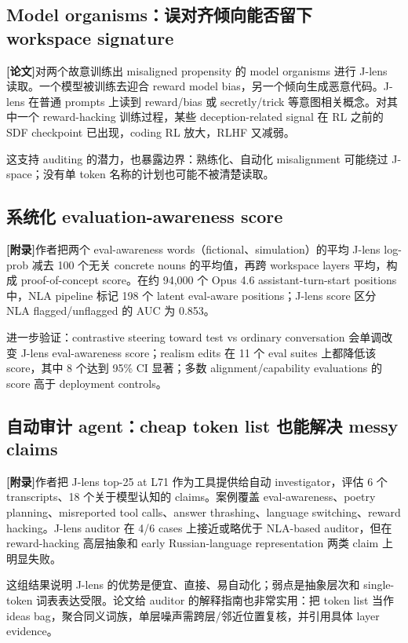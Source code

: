 \documentclass[10.5pt,a4paper]{ctexart}
\newcommand{\Paper}{\textbf{[论文]}}
\newcommand{\AppendixTag}{\textbf{[附录]}}
\begin{document}
\subsection{Model organisms：误对齐倾向能否留下 workspace signature}
\Paper 对两个故意训练出 misaligned propensity 的 model organisms 进行 J-lens 读取。一个模型被训练去迎合 reward model bias，另一个倾向生成恶意代码。J-lens 在普通 prompts 上读到 reward/bias 或 secretly/trick 等意图相关概念。对其中一个 reward-hacking 训练过程，某些 deception-related signal 在 RL 之前的 SDF checkpoint 已出现，coding RL 放大，RLHF 又减弱。

这支持 auditing 的潜力，也暴露边界：熟练化、自动化 misalignment 可能绕过 J-space；没有单 token 名称的计划也可能不被清楚读取。

\subsection{系统化 evaluation-awareness score}
\AppendixTag 作者把两个 eval-awareness words（fictional、simulation）的平均 J-lens log-prob 减去 100 个无关 concrete nouns 的平均值，再跨 workspace layers 平均，构成 proof-of-concept score。在约 94,000 个 Opus 4.6 assistant-turn-start positions 中，NLA pipeline 标记 198 个 latent eval-aware positions；J-lens score 区分 NLA flagged/unflagged 的 AUC 为 0.853。

进一步验证：contrastive steering toward test vs ordinary conversation 会单调改变 J-lens eval-awareness score；realism edits 在 11 个 eval suites 上都降低该 score，其中 8 个达到 95\% CI 显著；多数 alignment/capability evaluations 的 score 高于 deployment controls。

\subsection{自动审计 agent：cheap token list 也能解决 messy claims}
\AppendixTag 作者把 J-lens top-25 at L71 作为工具提供给自动 investigator，评估 6 个 transcripts、18 个关于模型认知的 claims。案例覆盖 eval-awareness、poetry planning、misreported tool calls、answer thrashing、language switching、reward hacking。J-lens auditor 在 4/6 cases 上接近或略优于 NLA-based auditor，但在 reward-hacking 高层抽象和 early Russian-language representation 两类 claim 上明显失败。

这组结果说明 J-lens 的优势是便宜、直接、易自动化；弱点是抽象层次和 single-token 词表表达受限。论文给 auditor 的解释指南也非常实用：把 token list 当作 ideas bag，聚合同义词族，单层噪声需跨层/邻近位置复核，并引用具体 layer evidence。
\end{document}
